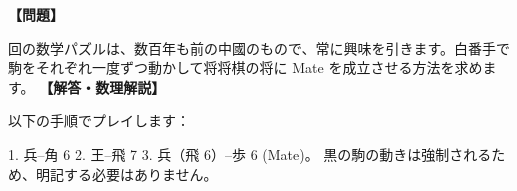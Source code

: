 \documentclass[10pt,a4paper,oneside,openany]{ltjsbook}
\begin{document}
\begin{tcolorbox}[colback=softblue,colframe=primaryblue,title=\textbf{第 357 問：古代中國のパズル （原題: ANCIENT CHINESE PUZZLE.）},arc=2mm,boxrule=1pt,breakable]
\textbf{【問題】}\par\vspace{0.3em}
回の数学パズルは、数百年も前の中國のもので、常に興味を引きます。白番手で駒をそれぞれ一度ずつ動かして将将棋の将に Mate を成立させる方法を求めます。
\tcblower
\textbf{【解答・数理解説】}\par\vspace{0.3em}
以下の手順でプレイします：

1. 兵--角 6
2. 王--飛 7
3. 兵（飛 6）--歩 6 (Mate)。
黒の駒の動きは強制されるため、明記する必要はありません。
\end{tcolorbox}
\end{document}
